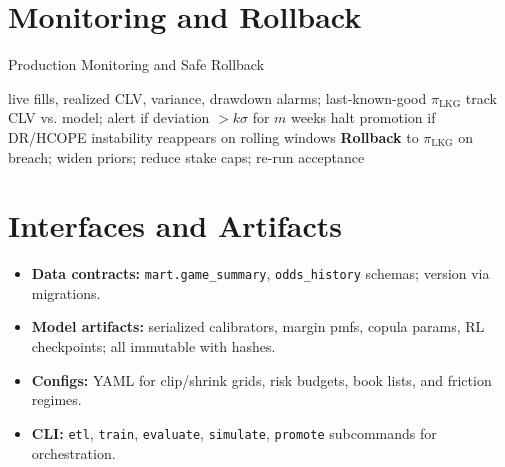 \section{Monitoring and Rollback}
\begin{algorithm}[H]\small
  \caption{Production Monitoring and Safe Rollback}
  \label{alg:monitoring}
  \begin{algorithmic}[1]
    \Require live fills, realized CLV, variance, drawdown alarms; last-known-good $\pi_{\text{LKG}}$
    \State track CLV vs. model; alert if deviation $>k\sigma$ for $m$ weeks
    \State halt promotion if DR/HCOPE instability reappears on rolling windows
    \State \textbf{Rollback} to $\pi_{\text{LKG}}$ on breach; widen priors; reduce stake caps; re-run acceptance
  \end{algorithmic}
\end{algorithm}

\section{Interfaces and Artifacts}
\begin{itemize}
  \item \textbf{Data contracts:} \texttt{mart.game\_summary}, \texttt{odds\_history} schemas; version via migrations.
  \item \textbf{Model artifacts:} serialized calibrators, margin pmfs, copula params, RL checkpoints; all immutable with hashes.
  \item \textbf{Configs:} YAML for clip/shrink grids, risk budgets, book lists, and friction regimes.
  \item \textbf{CLI:} \texttt{etl}, \texttt{train}, \texttt{evaluate}, \texttt{simulate}, \texttt{promote} subcommands for orchestration.
\end{itemize}
